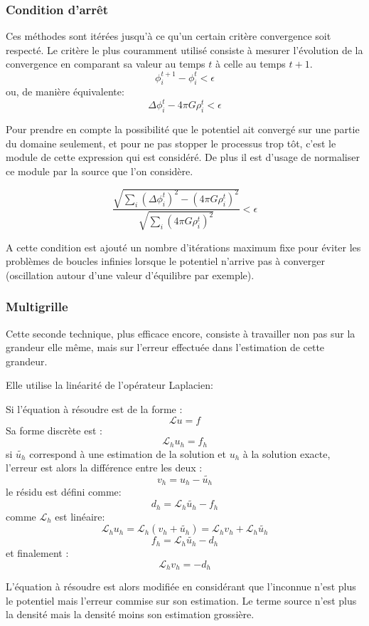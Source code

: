 \subsubsection{Condition d'arrêt}
Ces méthodes sont itérées jusqu’à ce qu'un certain critère convergence soit respecté. Le critère le plus couramment utilisé consiste à mesurer l'évolution de la convergence en comparant sa valeur au temps $t$ à celle au temps $t+1$.
\[ \phi^{t+1}_i - \phi^{t}_i < \epsilon \]
ou, de manière équivalente:
\[ \Delta \phi_i^t - 4 \pi G \rho^t_i< \epsilon \]

Pour prendre en compte la possibilité que le potentiel ait convergé sur une partie du domaine seulement, et pour ne pas stopper le processus trop tôt, c'est le module de cette expression qui est considéré. De plus il est d'usage de normaliser ce module par la source que l'on considère.

\[\dfrac{ \sqrt{  \sum_i \left (  \Delta \phi_i^t \right )^2 - \left (4 \pi G \rho^t_i  \right )^2 } }{\sqrt{  \sum_i  \left (4 \pi G \rho^t_i  \right )^2 } } < \epsilon \]

A cette condition est ajouté un nombre d'itérations maximum fixe pour éviter les problèmes de boucles infinies lorsque le potentiel n'arrive pas à converger (oscillation autour d'une valeur d'équilibre par exemple).

\subsubsection{Multigrille}
Cette seconde technique, plus efficace encore, consiste à travailler non pas sur la grandeur elle même, mais sur l'erreur effectuée dans l'estimation de cette grandeur.

Elle utilise la linéarité de l'opérateur Laplacien: 
 
Si l'équation à résoudre est de la forme : 
\[ \mathcal{L} u = f \]
Sa forme discrète est :
\[ \mathcal{L}_h u_h = f_h \]
si $\tilde{u_h}$ correspond à une estimation de la solution et $u_h$ à la solution exacte, l'erreur est alors la différence entre les deux : 
\[ v_h = u_h - \tilde{u_h} \]
le résidu est défini comme:
\[ d_h = \mathcal{L}_h \tilde{u_h} - f_h \]
comme $\mathcal{L}_h$ est linéaire:
\[ \mathcal{L}_h u_h = \mathcal{L}_h (v_h + \tilde{u_h} ) = \mathcal{L}_h v_h +\mathcal{L}_h \tilde{u_h} \]
\[ f_h   = \mathcal{L}_h \tilde{u_h} - d_h\]
et finalement :
\[ \mathcal{L}_h v_h = -d_h \]

L'équation à résoudre est alors modifiée en considérant que l'inconnue n'est plus le potentiel mais l'erreur commise sur son estimation. Le terme source n'est plus la densité mais la densité moins son estimation grossière.\\


